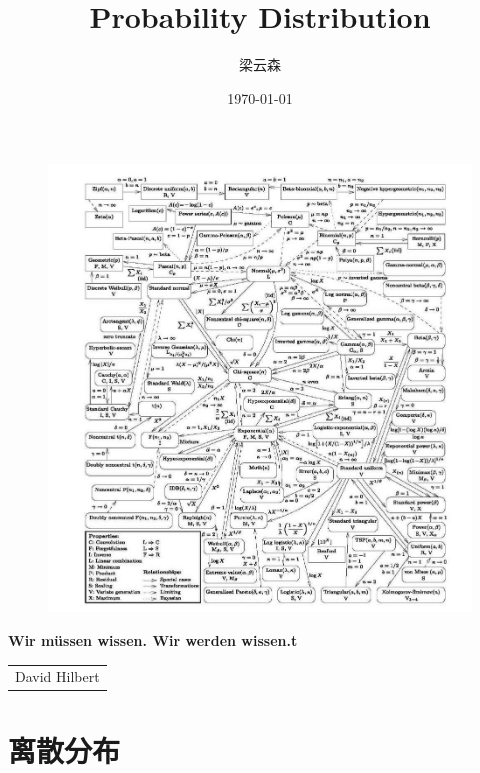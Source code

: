\documentclass[12pt, a4paper, oneside]{ctexbook}
\title{{\Huge{\textbf{Probability Distribution}}}\\}
\author{梁云森}
\date{\today}
\begin{document}
\maketitle

\setcounter{page}{1}

\begin{figure}[H]
  \centering
  \includegraphics[width=1\textwidth]{image/分布大全.png}
  \label{fig:example}
\end{figure}

\textbf{\Large{Wir müssen wissen. Wir werden wissen.t}}
~\\
\begin{flushright}
    \begin{tabular}{c}
        David Hilbert
    \end{tabular}
\end{flushright}

\newpage
{}
\setcounter{page}{1}
\tableofcontents
\newpage
\setcounter{page}{1}

\chapter{离散分布}
\end{document}
